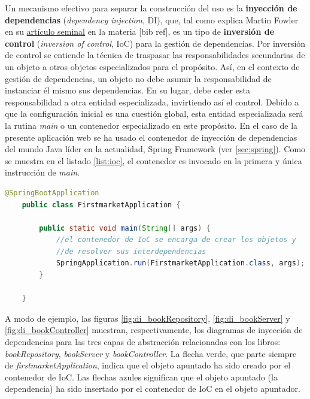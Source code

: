\documentclass[a4paper]{article}
\begin{document}
    Un mecanismo efectivo para separar la construcción del uso es la \textbf{inyección de dependencias} (\emph{dependency injection}, DI), que, tal como explica Martin Fowler en su \href{https://martinfowler.com/articles/injection.html}{artículo seminal} en la materia [bib ref], es un tipo de \textbf{inversión de control} (\emph{inversion of control}, IoC) para la gestión de dependencias. Por inversión de control se entiende la técnica de traspasar las responsabilidades secundarias de un objeto a otros objetos especializados para el propósito. Así, en el contexto de gestión de dependencias, un objeto no debe asumir la responsabilidad de instanciar él mismo sus dependencias. En su lugar, debe ceder esta responsabilidad a otra entidad especializada, invirtiendo así el control. Debido a que la configuración inicial es una cuestión global, esta entidad especializada será la rutina \emph{main} o un contenedor especializado en este propósito. En el caso de la presente aplicación web se ha usado el contenedor de inyección de dependencias del mundo Java líder en la actualidad, Spring Framework (ver \ref{sec:spring}). Como se muestra en el listado \ref{list:ioc}, el contenedor es invocado en la primera y única instrucción de \emph{main}.
    \\
    
    \begin{lstlisting}[language=Java,caption=Inversión de control de dependencias,label=list:ioc]
    @SpringBootApplication
    public class FirstmarketApplication {
    
    	public static void main(String[] args) {
    		//el contenedor de IoC se encarga de crear los objetos y 
    		//de resolver sus interdependencias
    		SpringApplication.run(FirstmarketApplication.class, args);
    	}
    
    }
    \end{lstlisting}
    
    A modo de ejemplo, las figuras \ref{fig:di_bookRepository}, \ref{fig:di_bookServer} y \ref{fig:di_bookController} muestran, respectivamente, los diagramas de inyección de dependencias para las tres capas de abstracción relacionadas con los libros: \emph{bookRepository}, \emph{bookServer} y \emph{bookController}. La flecha verde, que parte siempre de \emph{firstmarketApplication}, indica que el objeto apuntado ha sido creado por el contenedor de IoC. Las flechas azules significan que el objeto apuntado (la dependencia) ha sido insertado por el contenedor de IoC en el objeto apuntador.
\end{document}
